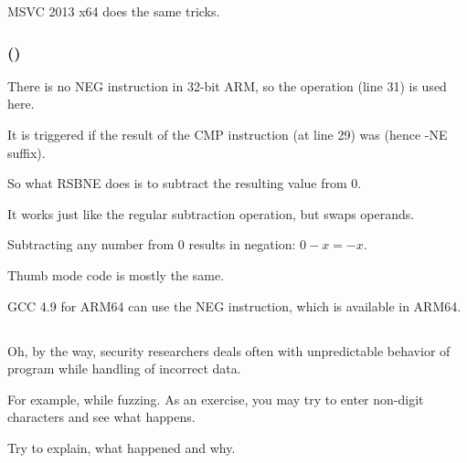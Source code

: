 \Optimizing MSVC 2013 x64 does the same tricks.

\subsubsection{\OptimizingKeilVI (\ARMMode)}



There is no NEG instruction in 32-bit ARM, so the  operation (line 31) 
is used here.

It is triggered if the result of the CMP instruction (at line 29) was  (hence -NE suffix).

So what RSBNE does is to subtract the resulting value from 0.

It works just like the regular subtraction operation, but swaps operands.

Subtracting any number from 0 results in negation: $0-x=-x$.

Thumb mode code is mostly the same.

GCC 4.9 for ARM64 can use the NEG instruction, which is available in ARM64.

\subsection{\Exercise{}}

Oh, by the way, security researchers deals often with unpredictable behavior of program while handling of incorrect data.

For example, while fuzzing.
As an exercise, you may try to enter non-digit characters and see what happens.

Try to explain, what happened and why.



